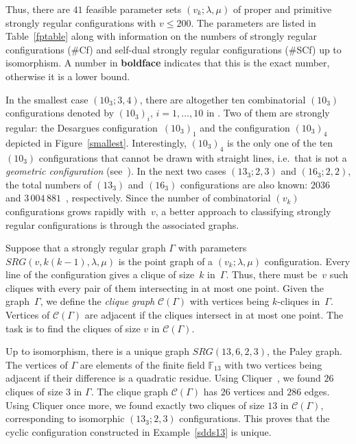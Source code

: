 \documentclass[12pt, reqno]{amsart}
\def\C{\mathcal{C}}
\def\F{\mathbb{F}}
\begin{document}
Thus, there are $41$ feasible parameter sets $(v_k;\lambda,\mu)$ of
proper and primitive strongly regular configurations with $v\le 200$.
The para\-meters are listed in Table~\ref{fptable} along with information
on the numbers of strongly regular configurations (\#Cf)
and self-dual strongly regular configurations (\#SCf) up to isomorphism.
A number in \textbf{boldface} indicates that this is the exact number,
otherwise it is a lower bound.

In the smallest case $(10_3;3,4)$, there are altogether ten combinatorial $(10_3)$
configurations denoted by $(10_3)_i$, $i=1,\ldots,10$ in \cite[Section~2.2]{BG09}.
Two of them are strongly regular: the Desargues configuration~$(10_3)_1$
and the configuration $(10_3)_4$ depicted in Figure~\ref{smallest}. Interestingly, $(10_3)_4$
is the only one of the ten $(10_3)$ configurations that cannot be drawn with
straight lines, i.e.\ that is not a \emph{geometric configuration} (see~\cite{BG09, PS13}).
In the next two cases $(13_3;2,3)$ and $(16_3;2,2)$, the total numbers of
$(13_3)$ and $(16_3)$ configurations are also known: $2036$~\cite{HG90} and $3\,004\,881$~\cite{BBP00},
respectively. Since the number of combinatorial $(v_k)$ configurations grows
rapidly with~$v$, a better approach to classifying strongly regular configurations is
through the associated graphs.

Suppose that a strongly regular graph $\Gamma$ with parameters $SRG(v,k(k-1),\lambda,\mu)$ is the point graph of
a $(v_k;\lambda,\mu)$ configuration. Every line of the configuration gives
a clique of size~$k$ in~$\Gamma$. Thus, there must be~$v$ such cliques with every pair of
them intersecting in at most one point. Given the graph~$\Gamma$, we define
the \emph{clique graph} $\C(\Gamma)$ with vertices being $k$-cliques in~$\Gamma$. Vertices
of $\C(\Gamma)$ are adjacent if the cliques intersect in at most one point. The task
is to find the cliques of size $v$ in $\C(\Gamma)$.

Up to isomorphism, there is a unique graph $SRG(13,6,2,3)$, the
Paley graph. The vertices of $\Gamma$ are elements of the finite field $\F_{13}$
with two vertices being adjacent if their difference is a quadratic residue. Using
Cliquer~\cite{NO03}, we found $26$ cliques of size $3$ in $\Gamma$.
The clique graph $\C(\Gamma)$ has $26$ vertices and $286$ edges. Using Cliquer once more,
we found exactly two cliques of size $13$ in $\C(\Gamma)$, corresponding
to isomorphic $(13_3;2,3)$ configurations. This proves that the cyclic configuration
constructed in Example~\ref{sdds13} is unique.
\end{document}
